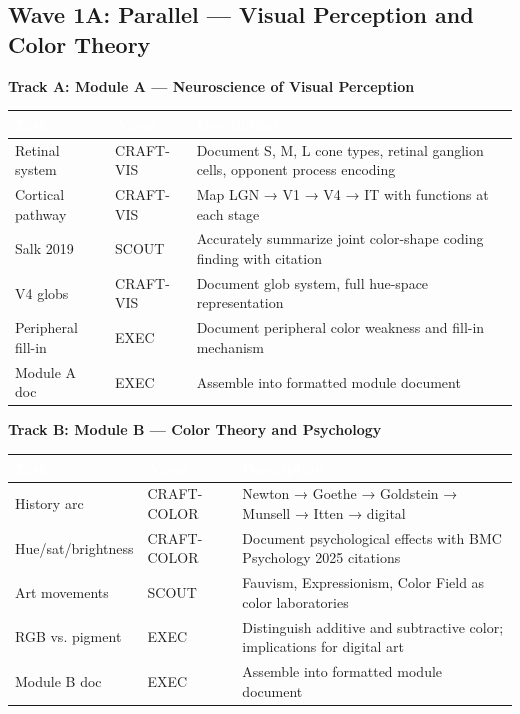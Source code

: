 \documentclass[11pt,letterpaper]{article}
\newcommand{\tableheader}[1]{\textbf{\sffamily\textcolor{white}{#1}}}
\begin{document}
\subsection{Wave 1A: Parallel --- Visual Perception and Color Theory}

\textbf{Track A: Module A --- Neuroscience of Visual Perception}
\begin{center}
\begin{tabularx}{\textwidth}{L{2.5cm}L{1.5cm}X}
\toprule
{}
\tableheader{Task} & \tableheader{Agent} & \tableheader{Description} \\
\midrule
Retinal system & CRAFT-VIS & Document S, M, L cone types, retinal ganglion cells, opponent process encoding \\
Cortical pathway & CRAFT-VIS & Map LGN → V1 → V4 → IT with functions at each stage \\
Salk 2019 & SCOUT & Accurately summarize joint color-shape coding finding with citation \\
V4 globs & CRAFT-VIS & Document glob system, full hue-space representation \\
Peripheral fill-in & EXEC & Document peripheral color weakness and fill-in mechanism \\
Module A doc & EXEC & Assemble into formatted module document \\
\bottomrule
\end{tabularx}
\end{center}

\textbf{Track B: Module B --- Color Theory and Psychology}
\begin{center}
\begin{tabularx}{\textwidth}{L{2.5cm}L{1.5cm}X}
\toprule
{}
\tableheader{Task} & \tableheader{Agent} & \tableheader{Description} \\
\midrule
History arc & CRAFT-COLOR & Newton → Goethe → Goldstein → Munsell → Itten → digital \\
Hue/sat/brightness & CRAFT-COLOR & Document psychological effects with BMC Psychology 2025 citations \\
Art movements & SCOUT & Fauvism, Expressionism, Color Field as color laboratories \\
RGB vs. pigment & EXEC & Distinguish additive and subtractive color; implications for digital art \\
Module B doc & EXEC & Assemble into formatted module document \\
\bottomrule
\end{tabularx}
\end{center}
\end{document}
